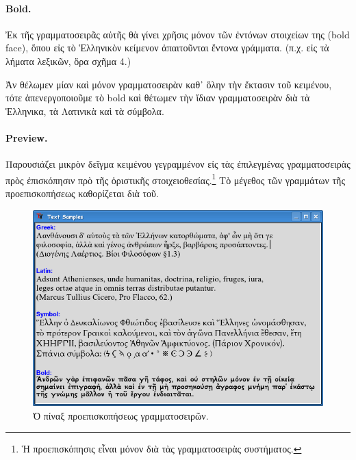 \documentclass[12pt,a4paper]{article}
\begin{document}
    \paragraph{Bold.} Ἐκ τῆς γραμματοσειρᾶς αὐτῆς θὰ γίνει χρῆσις μόνον
      τῶν ἐντόνων στοιχείων της (bold face), ὅπου εἰς τὸ Ἑλληνικὸν κείμενον
      ἀπαιτοῦνται ἔντονα γράμματα. (π.χ. εἰς τὰ λήματα λεξικῶν,
      ὅρα σχῆμα 4.)

      \vspace{3mm}
      \noindent
      Ἀν θέλωμεν μίαν καὶ μόνον γραμματοσειρὰν καθ᾽ ὅλην τὴν ἔκτασιν τοῦ
      κειμένου, τότε ἀπενεργοποιοῦμε
      τὸ bold καὶ θέτωμεν τὴν ἴδιαν γραμματοσειρὰν διὰ τὰ
      Ἑλληνικα, τὰ Λατινικὰ καὶ τὰ σύμβολα.
    \paragraph{Preview.} Παρουσιάζει μικρὸν δεῖγμα
      κειμένου γεγραμμένον εἰς τὰς ἐπιλεγμένας γραμματοσειρὰς πρὸς
      ἐπισκόπησιν πρὸ τῆς ὁριστικῆς
      στοιχειοθεσίας.\footnote{Ἡ προεπισκόπησις εἶναι μόνον διὰ τὰς
                                γραμματοσειρὰς συστήματος.}
      Τὸ μέγεθος τῶν γραμμάτων τῆς προεπισκοπήσεως καθορίζεται διὰ
      τοῦ.
                \begin{figure}[htb]
                  \begin{center}
                    \includegraphics[scale=0.5]{../images/textsamples.png}
                    \caption{Ὁ πίναξ προεπισκοπήσεως γραμματοσειρῶν.}
                  \end{center}
                \end{figure}
\end{document}
